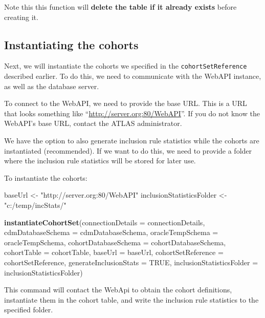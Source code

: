\documentclass[
]{article}
\newenvironment{Shaded}{\begin{snugshade}}{\end{snugshade}}
\newcommand{\DataTypeTok}[1]{\textcolor[rgb]{0.13,0.29,0.53}{#1}}
\newcommand{\KeywordTok}[1]{\textcolor[rgb]{0.13,0.29,0.53}{\textbf{#1}}}
\newcommand{\NormalTok}[1]{#1}
\newcommand{\OtherTok}[1]{\textcolor[rgb]{0.56,0.35,0.01}{#1}}
\newcommand{\StringTok}[1]{\textcolor[rgb]{0.31,0.60,0.02}{#1}}
\begin{document}
Note this this function will \textbf{delete the table if it already
exists} before creating it.

\hypertarget{instantiating-the-cohorts}{%
\subsection{Instantiating the cohorts}\label{instantiating-the-cohorts}}

Next, we will instantiate the cohorts we specified in the
\texttt{cohortSetReference} described earlier. To do this, we need to
communicate with the WebAPI instance, as well as the database server.

To connect to the WebAPI, we need to provide the base URL. This is a URL
that looks something like ``\url{http://server.org:80/WebAPI}''. If you
do not know the WebAPI's base URL, contact the ATLAS administrator.

We have the option to also generate inclusion rule statistics while the
cohorts are instantiated (recommended). If we want to do this, we need
to provide a folder where the inclusion rule statistics will be stored
for later use.

To instantiate the cohorts:

\begin{Shaded}
\begin{Highlighting}[]
\NormalTok{baseUrl <-}\StringTok{ "http://server.org:80/WebAPI"}
\NormalTok{inclusionStatisticsFolder <-}\StringTok{ "c:/temp/incStats/"}

\KeywordTok{instantiateCohortSet}\NormalTok{(}\DataTypeTok{connectionDetails =}\NormalTok{ connectionDetails,}
                     \DataTypeTok{cdmDatabaseSchema =}\NormalTok{ cdmDatabaseSchema,}
                     \DataTypeTok{oracleTempSchema =}\NormalTok{ oracleTempSchema,}
                     \DataTypeTok{cohortDatabaseSchema =}\NormalTok{ cohortDatabaseSchema,}
                     \DataTypeTok{cohortTable =}\NormalTok{ cohortTable,}
                     \DataTypeTok{baseUrl =}\NormalTok{ baseUrl,}
                     \DataTypeTok{cohortSetReference =}\NormalTok{ cohortSetReference,}
                     \DataTypeTok{generateInclusionStats =} \OtherTok{TRUE}\NormalTok{,}
                     \DataTypeTok{inclusionStatisticsFolder =}\NormalTok{ inclusionStatisticsFolder)}
\end{Highlighting}
\end{Shaded}

This command will contact the WebApi to obtain the cohort definitions,
instantiate them in the cohort table, and write the inclusion rule
statistics to the specified folder.
\end{document}
